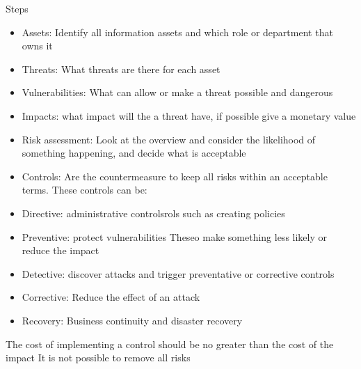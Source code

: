 Steps
\begin{itemize}
\item Assets: Identify all information assets and which role or department that owns it
\item Threats: What threats are there for each asset
\item Vulnerabilities: What can allow or make a threat possible and dangerous
\item Impacts: what impact will the a threat have, if possible give a monetary value
\item Risk assessment: Look at the overview and consider the likelihood of something happening, and decide what is acceptable
\item Controls: Are the countermeasure to keep all risks within an acceptable terms. These controls can be:
\item Directive: administrative controlsrols such as creating policies
\item Preventive: protect vulnerabilities Theseo make something less likely or reduce the impact
\item Detective: discover attacks and trigger preventative or corrective  controls
\item Corrective: Reduce the effect of an attack
\item Recovery: Business continuity and     disaster recovery
\end{itemize}
The cost of implementing a control should be no greater than the cost of the impact 
It is not possible to remove all risks 
